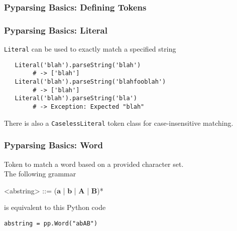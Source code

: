 \documentclass{beamer}
\begin{document}
\begin{frame}
\frametitle{Pyparsing Basics: Defining Tokens}
\begin{center}
\end{center}
\end{frame}



\begin{frame}[fragile]
\frametitle{Pyparsing Basics: Literal}
\texttt{Literal} can be used to exactly match a specified string
\begin{verbatim}
   Literal('blah').parseString('blah')  
        # -> ['blah']
   Literal('blah').parseString('blahfooblah')  
        # -> ['blah']
   Literal('blah').parseString('bla')  
        # -> Exception: Expected "blah"
\end{verbatim}
There is also a \texttt{CaselessLiteral} token class for case-insensitive matching.
\end{frame}

\begin{frame}[fragile]
 \frametitle{Pyparsing Basics: Word}
Token to match a word based on a provided character set. \\ 
\bigskip
The following grammar 
\begin{grammar}
<abstring> ::= ($\mathbf{a}$ | $\mathbf{b}$ | $\mathbf{A}$ | $\mathbf{B}$)*
 \end{grammar} 
\bigskip
is equivalent to this Python code
\begin{verbatim}
abstring = pp.Word("abAB")
 \end{verbatim}

\end{frame}
\end{document}
